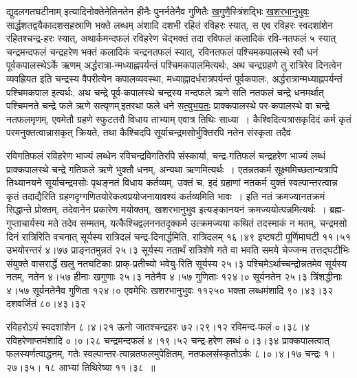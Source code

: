 \documentclass[11pt, openany]{book}
\begin{document}
द्युदलगतघटीनाम् \;इत्यादिनोक्तेनेति\textendash \;नतेन \;हीनैः \;पुनर्नतेनैव \;गुणितैः \hyperref[4.1]{खगुणै}स्त्रिंशद्भिः \hyperref[4.1]{खशरभानुभुवः} सार्द्धशतद्वयैकादशसहस्राणि भक्ते लब्धम् अंशादि दशभी रहितं रविहरः स्यात्, स एव रविहरः स्वदशांशेन रहितश्चन्द्र-हरः स्यात्, अथार्कमन्दफलं रविहरेण चेद्भक्तं तदा रविफलं कलादिकं रवि-नतफलं ५ स्यात् चन्द्रमन्दफलं चन्द्रहरेण भक्तं कलादिकं चन्द्रनतफलं स्यात्, रविनतफलं पश्चिमकपालस्थे रवौ धनं पूर्वकपालस्थेऽर्के ऋणम् अर्द्धरात्रा-न्मध्याह्नपर्यन्तं पश्चिमकपालमित्यर्थः, अथ चन्द्रग्रहणे तु रात्रिरेव दिनत्वेन व्यवह्रियत इति चन्द्रस्य वैपरीत्येन कपालव्यवस्था, मध्याह्नादर्धरात्रपर्यन्तं पूर्वकपालः, अर्द्धरात्रान्मध्याह्नपर्यन्तं पश्चिमकपाल इत्यर्थः, अथ चन्द्रे पूर्व-कपालस्थे चन्द्रस्य मन्दफले ऋणे सति नतफलं चन्द्रे धनमर्थात् पश्चिमनते चन्द्रे फले ऋणे सत्यृणम्\textendash \,इतरथा फले धने स\hyperref[4.2.1]{त्युभयतः} प्राक्कपालस्थे पर-कपालस्थे वा चन्द्रे नतफलमृणम्, एवमेतौ ग्रहणे स्फुटतरौ विधाय ताभ्याम् एवात्र तिथिः साध्या~। कैश्विदित्यत्रासकृदिदं कर्म कृतं परमनुक्तत्वान्नासकृत् क्रियते, तथा कैश्चिदपि सूर्याचन्द्रमसोर्भुक्तिरपि नतेन संस्कृता तदैवं

\newpage

\noindent रविगतिफलं रविहरेण भाज्यं लब्धेन रविचन्द्रविगतिरपि संस्कार्या, चन्द्र-गतिफलं \;चन्द्रहरेण \;भाज्यं \;लब्धं \;प्राक्कपालस्थे \;चन्द्रे \;गतिफले \;ऋणे \;भुक्तौ धनम्, अन्यथा ऋणमित्यर्थः~। एतन्नतकर्म सूक्ष्ममिच्छतान्यत्रापि तिथ्यानयने सूर्याचन्द्रमसोः पृथङ्नतं विधाय कर्तव्यम्, उक्तं च, {\color{violet}इदं ग्रहाणां नतकर्म युक्तं स्वल्पान्तरत्वान्न \;कृतं \;तदाद्यै}रिति \;ग्रहणदृग्गणितयोरेकत्वप्रयोजनायावश्यं कर्तव्यमिति भावः~। इति नतं क्रमज्यानतक्रमं सिद्धान्ते प्रोक्तम्, तदेवानेन प्रकारेण मयोक्तम्, खशरभानुभुव इत्यङ्कानयनं क्रमज्ययोत्पन्नमित्यर्थः~। ब्रह्म-गुप्ताचार्यस्य मते तदेव सम्मतम्, यत्कैश्चिद्वलननतदृक्कर्म उत्क्रमज्यया कथितं तदस्माकं न मतम्, चन्द्रमसो दिनं रात्रिरिति वचनात् सूर्यस्य रात्रिदलं चन्द्र-दिनार्द्धमिति, रात्रिदलम् १६।४९ इष्टषटी पूर्णिमाघटी ११।५१ उभयोरन्तरं ४।७७ \;प्राङ्नतमुन्नतं \;२५।३ \;सूर्यस्य \;नतार्थं \;रात्रिशेषे \;गते \;वा \;भवति \;समये चेज्जन्म तत्तद्घटीभिः संयुक्ते वासरार्द्धे खलु नतघटिकाः प्राक्-प्रतीच्यो भवेयु-रिति सूर्यस्य २५।३ पश्चिमेऽर्थाच्चन्द्रोन्नतमेव सूर्यस्य नतम्, नतेन ४।५७ हीनाः खगुणाः २५।३ नतेनैव ४।५७ गुणिताः १२४।० सूर्यनतेन २५।३ त्रिंशद्धीनाः ४।५७ सूर्यनतेनैव गुणिता १२४।० एवमेभिः खशरभानुभुवः ११२५० भक्ता लब्धमंशादि ९०।४३।३२ दशवर्जितं ८०।४३।३२

\newpage

\noindent रविहरोऽयं स्वदशांशेन ८।४।२१ ऊनो जातश्चन्द्रहरः ७२।२९।१२ रविमन्द-फलं ०।३८।४ रविहरेणाप्तमंशादि ०।०।२८ चन्द्रमन्दफलं ४।१९।५२ चन्द्र-हरेण लब्धं ०।३।३४ प्राक्कपालत्वात् फलस्यर्णत्वाद्धनम्, गतेः स्वल्पान्तर-त्वान्नतफलमुपेक्षितम्, नतफलसंस्कृतोऽर्कः ८।०।४।१७ चन्द्रः १।२७।३५। १८ आभ्यां तिथिरेष्या ११।३८~॥\\
\end{document}
